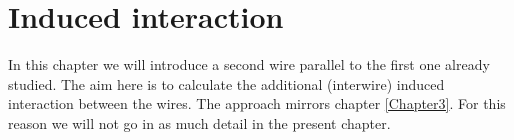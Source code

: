
\chapter{Induced interaction} %

\label{Chapter8} %


In this chapter we will introduce a second wire parallel to the first one already studied. The aim here is to calculate the additional (interwire) induced interaction between the wires. The approach mirrors chapter \ref{Chapter3}. For this reason we will not go in as much detail in the present chapter.
